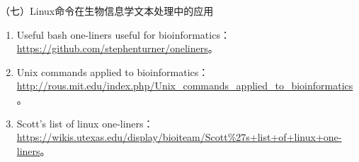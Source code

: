\vspace{0.1in}
（七）Linux命令在生物信息学文本处理中的应用
\begin{enumerate}
  \item Useful bash one-liners useful for bioinformatics：\\ \href{https://github.com/stephenturner/oneliners}{https://github.com/stephenturner/oneliners}。
  \item Unix commands applied to bioinformatics：\\ \href{http://rous.mit.edu/index.php/Unix\_commands\_applied\_to\_bioinformatics}{http://rous.mit.edu/index.php/Unix\_commands\_applied\_to\_bioinformatics}。
  \item Scott's list of linux one-liners：\\ \href{https://wikis.utexas.edu/display/bioiteam/Scott\%27s+list+of+linux+one-liners}{https://wikis.utexas.edu/display/bioiteam/Scott\%27s+list+of+linux+one-liners}。
\end{enumerate}

